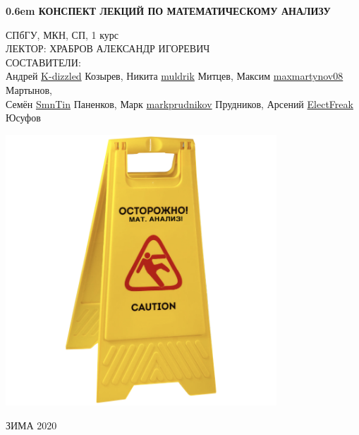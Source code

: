 \documentclass[12pt,letterpaper]{report}
\theoremstyle{definition}
\begin{document}
\clearpage
\newcommand\nbvspace[1][3]{\vspace*{\stretch{#1}}}
\newcommand\nbstretchyspace{\spaceskip0.5em plus 0.25em minus 0.25em}
\newcommand{\nbtitlestretch}{\spaceskip0.6em}
\pagestyle{empty}
\begin{center}
\bfseries
\nbvspace[1]
\Huge
{\nbtitlestretch\huge
КОНСПЕКТ ЛЕКЦИЙ ПО МАТЕМАТИЧЕСКОМУ АНАЛИЗУ}

\nbvspace[1]
\normalsize

СПбГУ, МКН, СП, 1 курс\\
ЛЕКТОР: ХРАБРОВ АЛЕКСАНДР ИГОРЕВИЧ
\nbvspace[1]
\\
\Large СОСТАВИТЕЛИ:\\[0.5em]
\footnotesize 
Андрей \href{https://github.com/K-dizzled}{K-dizzled} Козырев, 
Никита  \href{https://github.com/muldrik}{muldrik} Митцев,
Максим \href{https://github.com/maxmartynov08}{maxmartynov08} Мартынов,\\ 
Семён \href{https://github.com/SmnTin}{SmnTin} Паненков,
Марк \href{https://github.com/markprudnikov}{markprudnikov} Прудников,
Арсений \href{https://github.com/ElectFreak}{ElectFreak} Юсуфов

\nbvspace[2]

\includegraphics[width=4.0in]{./images/Danger_matan.png}
\nbvspace[3]
\normalsize

\large
ЗИМА 2020
\nbvspace[1]
\end{center}
\newpage
\pagestyle{plain}
\fi
\end{document}
